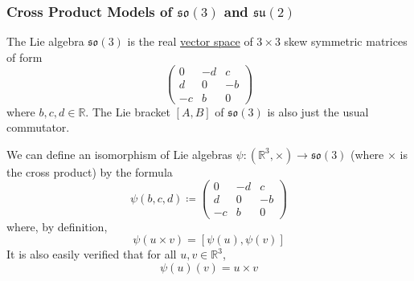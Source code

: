 \documentclass{article}
\newcounter{definition}[section]
\newcounter{example}[section]
\begin{document}
  \subsubsection{Cross Product Models of $\mathfrak{so}(3)$ and $\mathfrak{su}(2)$}

      \begin{example}
        \label{ex:the-lie-algebra-mathfrakso3}
        The Lie algebra $\mathfrak{so}(3)$ is the real \hyperref[lin-def:vector-space]{vector space} of $3 \times 3$ skew symmetric matrices of form 
        \begin{equation}
          \begin{pmatrix}
          0 & -d & c \\ d & 0 & -b \\ -c & b & 0
          \end{pmatrix}
        \end{equation}
        where $b, c, d \in \mathbb{R}$. The Lie bracket $[A,B]$ of $\mathfrak{so}(3)$ is also just the usual commutator. 

        We can define an isomorphism of Lie algebras $\psi: (\mathbb{R}^3, \times) \rightarrow \mathfrak{so}(3)$ (where $\times$ is the cross product) by the formula 
        \begin{equation}
          \psi(b, c, d) \coloneqq \begin{pmatrix}
          0 & -d & c \\
          d & 0 & -b \\
          -c & b & 0
          \end{pmatrix}
        \end{equation}
        where, by definition, 
        \begin{equation}
          \psi(u \times v) = [\psi(u), \psi(v)]
        \end{equation}
        It is also easily verified that for all $u, v \in \mathbb{R}^3$, 
        \begin{equation}
          \psi(u) (v) = u \times v
        \end{equation}
      \end{example}
\end{document}
